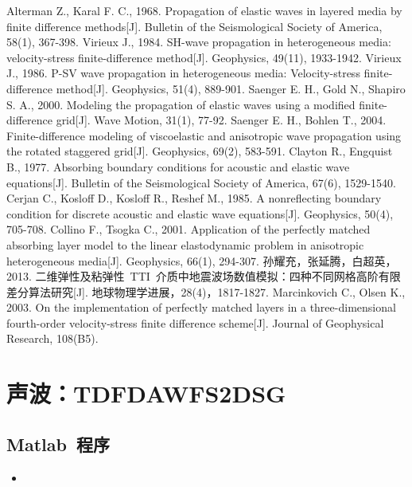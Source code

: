 \documentclass[UTF8]{ctexart}
\renewcommand{\thesection}{\chinese{section}、\kern -1em}                                           %
\newcommand{\insertMcode}[2]{\begin{itemize}\item[]\end{itemize}}
\begin{document}
\newpage
\begin{thebibliography}{9}
Alterman Z., Karal F. C., 1968. Propagation of elastic waves in layered media by finite difference methods[J]. Bulletin of the Seismological Society of America, 58(1), 367-398.
Virieux J., 1984. SH-wave propagation in heterogeneous media: velocity-stress finite-difference method[J]. Geophysics, 49(11), 1933-1942.
Virieux J., 1986. P-SV wave propagation in heterogeneous media: Velocity-stress finite-difference method[J]. Geophysics, 51(4), 889-901.
Saenger E. H., Gold N., Shapiro S. A., 2000. Modeling the propagation of elastic waves using a modified finite-difference grid[J]. Wave Motion, 31(1), 77-92.
Saenger E. H., Bohlen T., 2004. Finite-difference modeling of viscoelastic and anisotropic wave propagation using the rotated staggered grid[J]. Geophysics, 69(2), 583-591.
Clayton R., Engquist B., 1977. Absorbing boundary conditions for acoustic and elastic wave equations[J]. Bulletin of the Seismological Society of America, 67(6), 1529-1540.
Cerjan C., Kosloff D., Kosloff R., Reshef M., 1985. A nonreflecting boundary condition for discrete acoustic and elastic wave equations[J]. Geophysics, 50(4), 705-708.
Collino F., Tsogka C., 2001. Application of the perfectly matched absorbing layer model to the linear elastodynamic problem in anisotropic heterogeneous media[J]. Geophysics, 66(1), 294-307.
孙耀充，张延腾，白超英，2013. 二维弹性及粘弹性~TTI~介质中地震波场数值模拟：四种不同网格高阶有限差分算法研究[J]. 地球物理学进展，28(4)，1817-1827.
Marcinkovich C., Olsen K., 2003. On the implementation of perfectly matched layers in a three-dimensional fourth-order velocity-stress finite difference scheme[J]. Journal of Geophysical Research, 108(B5).
\end{thebibliography}

\newpage
\setmonofont{Consolas}                           %
\setsansfont{Consolas}                           %
\setmainfont{Consolas}                           %

\appendix
\renewcommand{\thesection}{附录\kern 0em}
\section{声波：TDFDAWFS2DSG}
\subsection{Matlab~程序}
\insertMcode{./Code/TDFDAWFS2DSG.m}{}
\end{document}
